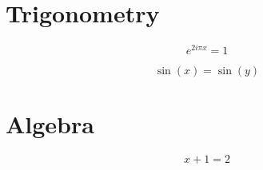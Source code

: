 \documentclass[10pt,a4paper]{article}
\begin{document}
\section{Trigonometry}

\begin{equation}
e^{2i \pi x} = 1
\end{equation}

\begin{equation}
\sin(x)=\sin(y)
\end{equation}

\section{Algebra}

\begin{equation}
x+1=2
\end{equation}
\end{document}
